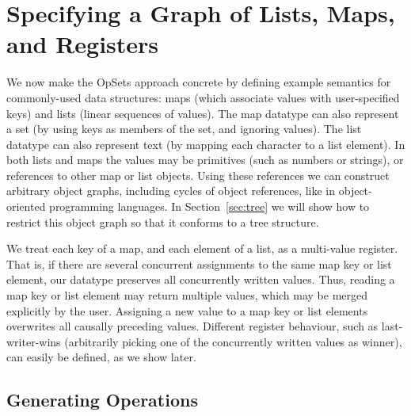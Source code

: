 \section{Specifying a Graph of Lists, Maps, and Registers}\label{sec:datatypes}

We now make the OpSets approach concrete by defining example semantics for commonly-used data structures: maps (which associate values with user-specified keys) and lists (linear sequences of values).
The map datatype can also represent a set (by using keys as members of the set, and ignoring values).
The list datatype can also represent text (by mapping each character to a list element).
In both lists and maps the values may be primitives (such as numbers or strings), or references to other map or list objects.
Using these references we can construct arbitrary object graphs, including cycles of object references, like in object-oriented programming languages.
In Section~\ref{sec:tree} we will show how to restrict this object graph so that it conforms to a tree structure.

We treat each key of a map, and each element of a list, as a multi-value register.
That is, if there are several concurrent assignments to the same map key or list element, our datatype preserves all concurrently written values.
Thus, reading a map key or list element may return multiple values, which may be merged explicitly by the user.
Assigning a new value to a map key or list elements overwrites all causally preceding values.
Different register behaviour, such as last-writer-wins (arbitrarily picking one of the concurrently written values as winner), can easily be defined, as we show later.

\subsection{Generating Operations}\label{sec:datatypes-gen}

